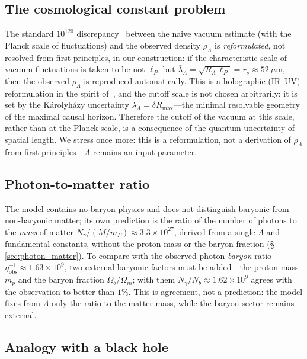 \documentclass[10pt,a4paper]{article}
\begin{document}
\subsection{The cosmological constant problem}

The standard $10^{120}$ discrepancy~\cite{Weinberg1989} between the naive vacuum estimate (with the Planck scale of fluctuations) and the observed density $\rho_\Lambda$ is \emph{reformulated}, not resolved from first principles, in our construction: if the characteristic scale of vacuum fluctuations is taken to be not $\ell_P$ but $\bar\lambda_\Lambda = \sqrt{R_\Lambda\,\ell_P} = r_s \approx 52~\mu$m, then the observed $\rho_\Lambda$ is reproduced automatically. This is a holographic (IR--UV) reformulation in the spirit of~\cite{Cohen1999,Li2004,Padmanabhan2005,WangWangLi2017}, and the cutoff scale is not chosen arbitrarily: it is set by the K\'arolyh\'azy uncertainty $\bar\lambda_\Lambda = \delta R_{\max}$---the minimal resolvable geometry of the maximal causal horizon. Therefore the cutoff of the vacuum at this scale, rather than at the Planck scale, is a consequence of the quantum uncertainty of spatial length. We stress once more: this is a reformulation, not a derivation of $\rho_\Lambda$ from first principles---$\Lambda$ remains an input parameter.

\subsection{Photon-to-matter ratio}

The model contains no baryon physics and does not distinguish baryonic from non-baryonic matter; its own prediction is the ratio of the number of photons to the \emph{mass} of matter $N_\gamma/(M/m_P) \approx 3.3\times10^{27}$, derived from a single $\Lambda$ and fundamental constants, without the proton mass or the baryon fraction (\S\,\ref{sec:photon_matter}). To compare with the observed photon-\emph{baryon} ratio $\eta_{\mathrm{obs}}^{-1}\approx1.63\times10^9$, two external baryonic factors must be added---the proton mass $m_p$ and the baryon fraction $\Omega_b/\Omega_m$; with them $N_\gamma/N_b\approx1.62\times10^9$ agrees with the observation to better than $1\%$. This is agreement, not a prediction: the model fixes from $\Lambda$ only the ratio to the matter mass, while the baryon sector remains external.

\subsection{Analogy with a black hole}
\end{document}
